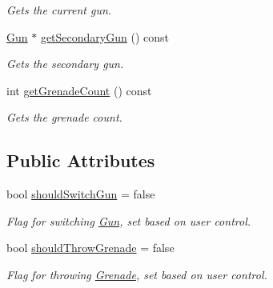 \begin{DoxyCompactItemize}
\begin{DoxyCompactList}\small\item\em Gets the current gun. \end{DoxyCompactList}\item 
\mbox{\label{class_player_ae56560a28eaa311bf4f5d6a477dcdd95}} 
\mbox{\hyperlink{class_gun}{Gun}} $\ast$ \mbox{\hyperlink{class_player_ae56560a28eaa311bf4f5d6a477dcdd95}{get\+Secondary\+Gun}} () const
\begin{DoxyCompactList}\small\item\em Gets the secondary gun. \end{DoxyCompactList}\item 
\mbox{\label{class_player_ab4da1510cad990bb4d3fa5c859be0d8a}} 
int \mbox{\hyperlink{class_player_ab4da1510cad990bb4d3fa5c859be0d8a}{get\+Grenade\+Count}} () const
\begin{DoxyCompactList}\small\item\em Gets the grenade count. \end{DoxyCompactList}\end{DoxyCompactItemize}
\subsection*{Public Attributes}
\begin{DoxyCompactItemize}
\item 
\mbox{\label{class_player_a019b279c02f0dd088e01fdc8976a6758}} 
bool \mbox{\hyperlink{class_player_a019b279c02f0dd088e01fdc8976a6758}{should\+Switch\+Gun}} = false
\begin{DoxyCompactList}\small\item\em Flag for switching \mbox{\hyperlink{class_gun}{Gun}}, set based on user control. \end{DoxyCompactList}\item 
\mbox{\label{class_player_a7240131c685fbcc2aba410651bbf9f31}} 
bool \mbox{\hyperlink{class_player_a7240131c685fbcc2aba410651bbf9f31}{should\+Throw\+Grenade}} = false
\begin{DoxyCompactList}\small\item\em Flag for throwing \mbox{\hyperlink{class_grenade}{Grenade}}, set based on user control. \end{DoxyCompactList}\end{DoxyCompactItemize}
